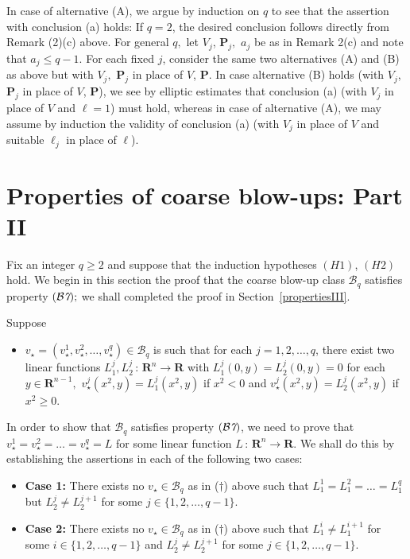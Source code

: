 \documentclass[a4paper,11pt]{amsart}
\begin{document}
In case of alternative (A), we argue by induction on $q$ to see that the assertion with conclusion (a) holds: If $q=2$, the desired conclusion follows directly from Remark (2)(c) above. For general $q,$ let $V_{j}$, ${\mathbf P}_{j}, $ $a_{j}$ be as in Remark 2(c) and note that $a_{j} \leq q-1.$ For each fixed 
$j$, consider the same two alternatives (A) and (B) as above but with $V_{j},$ ${\mathbf P}_{j}$ in place of $V$, ${\mathbf P}$. In case alternative (B) holds (with $V_{j}$, ${\mathbf P}_{j}$ in place of $V$, ${\mathbf P}$), we see by elliptic estimates that conclusion (a) (with $V_{j}$ in place of $V$ and $\ell = 1$) must hold, whereas in case of alternative (A), we may assume by induction the validity of conclusion (a) (with $V_{j}$ in place of $V$ and suitable $\ell_{j}$ in place of $\ell$).

\section{Properties of coarse blow-ups: Part II}\label{step3}
\setcounter{equation}{0}
Fix an integer $q \geq 2$ and suppose that the induction hypotheses $(H1)$, $(H2)$ hold. We begin in this section the proof that the coarse blow-up class ${\mathcal B}_{q}$ satisfies property $({\mathcal B{\emph 7}});$  we shall completed the proof in Section~\ref{propertiesIII}. 

Suppose
\begin{itemize}
\item[(\dag)] $v_{\star}  = (v_{\star}^{1}, v_{\star}^{2}, \ldots, v_{\star}^{q}) \in {\mathcal B}_{q}$ is such that for each $j=1, 2, \ldots, q$, there exist two linear functions $L_{1}^{j}, L_{2}^{j} \, : \, {\mathbf R}^{n} \to {\mathbf R}$ with $L_{1}^{j}(0, y) = L_{2}^{j}(0, y) = 0$ for each $y \in {\mathbf R}^{n-1},$ $v_{\star}^{j}(x^{2}, y) = L_{1}^{j}(x^{2}, y)$ if $x^{2} < 0$ and $v_{\star}^{j}(x^{2}, y) = L_{2}^{j}(x^{2}, y)$ if $x^{2} \geq 0.$ 
\end{itemize}

In order to show that ${\mathcal B}_{q}$ satisfies property $({\mathcal B{\emph 7}})$, we need to prove that 
$v_{\star}^{1} = v_{\star}^{2} = \ldots = v_{\star}^{q} = L$ for some linear function $L \, : \,{\mathbf R}^{n} \to {\mathbf R}.$ We shall do this by establishing the assertions in each of the following two cases:
\begin{itemize}
\item[]{\bf Case 1:} There exists no $v_{\star} \in {\mathcal B}_{q}$ as in ($\dag$) above such that $L_{1}^{1} = L_{1}^{2} = \ldots = L_{1}^{q}$ but $L_{2}^{j} \neq L_{2}^{j +1}$ for some  $j\in \{1, 2, \ldots, q-1\}$.
\item[]{\bf Case 2:} There exists no $v_{\star} \in {\mathcal B}_{q}$ as in ($\dag$) above such that $L_{1}^{i} \neq L_{1}^{i+1}$ for some $i \in \{1, 2, \ldots, q-1\}$ and 
$L_{2}^{j} \neq L_{2}^{j +1}$ for some  $j\in \{1, 2, \ldots, q-1\}$.
\end{itemize}
\end{document}
